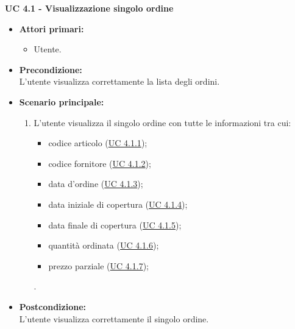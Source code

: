 \noindent \textbf{\large UC 4.1 - Visualizzazione singolo ordine}
\label{uc:visualizzazione-singolo-ordine}
\begin{itemize}

	\item \textbf{Attori primari: }
		\begin{itemize}
			\item Utente.
		\end{itemize}

	\item \textbf{Precondizione: }\\[0.3cm]
		L'utente visualizza correttamente la lista degli ordini.

	\item \textbf{Scenario principale: }
		\begin{enumerate}
			\item L'utente visualizza il singolo ordine con tutte le informazioni tra cui:
			\begin{itemize}
				\item codice articolo (\hyperref[uc:visualizzazione-codice-articolo]{UC 4.1.1});
				\item codice fornitore (\hyperref[uc:visualizzazione-codice-fornitore]{UC 4.1.2});
				\item data d'ordine (\hyperref[uc:visualizzazione-data-ordine]{UC 4.1.3});
				\item data iniziale di copertura (\hyperref[uc:visualizzazione-data-iniziale-copertura]{UC 4.1.4});
				\item data finale di copertura (\hyperref[uc:visualizzazione-data-finale-copertura]{UC 4.1.5});
				\item quantità ordinata (\hyperref[uc:visualizzazione-quantita-ordinata]{UC 4.1.6});
				\item prezzo parziale (\hyperref[uc:visualizzazione-prezzo-parziale-ord]{UC 4.1.7});
			\end{itemize}.
		\end{enumerate}
		

	\item \textbf{Postcondizione: }\\[0.3cm]
		L'utente visualizza correttamente il singolo ordine.

\end{itemize}

\vspace{0.5cm}

